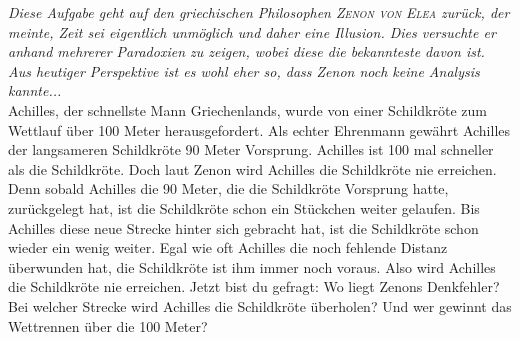 \begin{prob}
  \textit{Diese Aufgabe geht auf den griechischen Philosophen \textsc{Zenon von
      Elea} zurück, der meinte, Zeit sei eigentlich unmöglich und daher eine
    Illusion. Dies versuchte er anhand mehrerer Paradoxien zu zeigen, wobei
    diese die bekannteste davon ist. Aus heutiger Perspektive ist es wohl eher
    so, dass
    Zenon noch keine Analysis kannte...}\\
  Achilles, der schnellste Mann Griechenlands, wurde von einer Schildkröte zum
  Wettlauf über 100 Meter herausgefordert. Als echter Ehrenmann gewährt Achilles
  der langsameren Schildkröte 90 Meter Vorsprung. Achilles ist 100 mal schneller
  als die Schildkröte. Doch laut Zenon wird Achilles die Schildkröte nie
  erreichen. Denn sobald Achilles die 90 Meter, die die Schildkröte Vorsprung
  hatte, zurückgelegt hat, ist die Schildkröte schon ein Stückchen weiter
  gelaufen. Bis Achilles diese neue Strecke hinter sich gebracht hat, ist die
  Schildkröte schon wieder ein wenig weiter. Egal wie oft Achilles die noch
  fehlende Distanz überwunden hat, die Schildkröte ist ihm immer noch voraus.
  Also wird Achilles die Schildkröte nie erreichen. Jetzt bist du gefragt: Wo
  liegt Zenons Denkfehler? Bei welcher Strecke wird Achilles die Schildkröte
  überholen? Und wer gewinnt das Wettrennen über die 100 Meter?
\end{prob}
